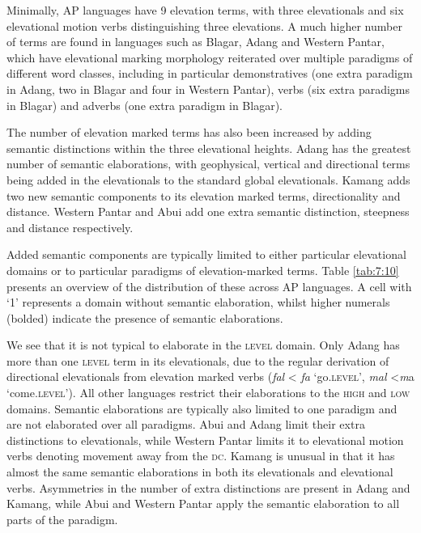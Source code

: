 Minimally, AP languages have 9 elevation terms, with three elevationals and six elevational motion verbs distinguishing three elevations. A much higher number of terms are found in languages such as Blagar, Adang and Western Pantar, which have elevational marking morphology reiterated over multiple paradigms of different word classes, including in particular demonstratives (one extra paradigm in Adang, two in Blagar and four in Western Pantar), verbs (six extra paradigms in Blagar) and adverbs (one extra paradigm in Blagar).

The number of elevation marked terms has also been increased by adding semantic distinctions within the three elevational heights. Adang has the greatest number of semantic elaborations, with geophysical, vertical and directional terms being added in the elevationals to the standard global elevationals. Kamang adds two new semantic components to its elevation marked terms, directionality and distance. Western Pantar and Abui add one extra semantic distinction, steepness and distance respectively. 

Added semantic components are typically limited to either particular elevational domains or to particular paradigms of elevation-marked terms. Table \ref{tab:7:10} presents an overview of the distribution of these across AP languages. A cell with `1' represents a domain without semantic elaboration, whilst higher numerals (bolded) indicate the presence of semantic elaborations. 

We see that it is not typical to elaborate in the \textsc{level} domain. Only Adang has more than one \textsc{level} term in its elevationals, due to the regular derivation of directional elevationals from elevation marked verbs (\textit{fal}\textit{{\textepsilon}} {\textless} \textit{fa} `go\textsc{.level',} \textit{mal}\textit{{\textepsilon}} {\textless}\textit ma  `come\textsc{.level'}). All other languages restrict their elaborations to the \textsc{high} and \textsc{low} domains. Semantic elaborations are typically also limited to one paradigm and are not elaborated over all paradigms. Abui and Adang limit their extra distinctions to elevationals, while Western Pantar limits it to elevational motion verbs denoting movement away from the \textsc{dc}. Kamang is unusual in that it has almost the same semantic elaborations in both its elevationals and elevational verbs. Asymmetries in the number of extra distinctions are present in Adang and Kamang, while Abui and Western Pantar apply the semantic elaboration to all parts of the paradigm.
 

